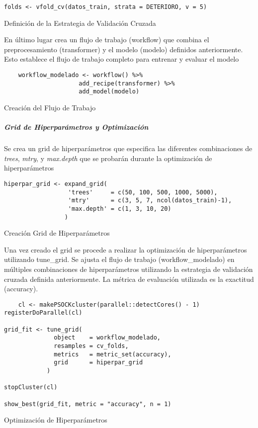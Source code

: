 \begin{code}[H]
\begin{lstlisting}[style=mystyle]
    folds <- vfold_cv(datos_train, strata = DETERIORO, v = 5)
\end{lstlisting}
\caption{Definición de la Estrategia de Validación Cruzada}
\label{code:Definición de la Estrategia de Validación Cruzada}
\end{code}

En último lugar crea un flujo de trabajo (workflow) que combina el preprocesamiento (transformer) y el modelo (modelo) definidos anteriormente. Esto establece el flujo de trabajo completo para entrenar y evaluar el modelo

\begin{code}[H]
\begin{lstlisting}
    workflow_modelado <- workflow() %>%
                     add_recipe(transformer) %>%
                     add_model(modelo)
\end{lstlisting}
\caption{Creación del Flujo de Trabajo}
\label{code:Creación del Flujo de Trabajo}
\end{code}

\subparagraph{Grid de Hiperparámetros y Optimización}

Se crea un grid de hiperparámetros que especifica las diferentes combinaciones de \textit{trees}, \textit{mtry}, y \textit{max.depth} que se probarán durante la optimización de hiperparámetros

\begin{code}[H]
\begin{lstlisting}[style=mystyle]
    hiperpar_grid <- expand_grid(
                  'trees'     = c(50, 100, 500, 1000, 5000),
                  'mtry'      = c(3, 5, 7, ncol(datos_train)-1),
                  'max.depth' = c(1, 3, 10, 20)
                 )
\end{lstlisting}
\caption{Creación Grid de Hiperparámetros}
\label{code:Creación Grid de Hiperparámetros}
\end{code}

Una vez creado el grid se procede a realizar la optimización de hiperparámetros utilizando tune\_grid. Se ajusta el flujo de trabajo (workflow\_modelado) en múltiples combinaciones de hiperparámetros utilizando la estrategia de validación cruzada definida anteriormente. La métrica de evaluación utilizada es la exactitud (accuracy). 

\begin{code}[H]
\begin{lstlisting}
    cl <- makePSOCKcluster(parallel::detectCores() - 1)
registerDoParallel(cl)

grid_fit <- tune_grid(
              object    = workflow_modelado,
              resamples = cv_folds,
              metrics   = metric_set(accuracy),
              grid      = hiperpar_grid
            )

stopCluster(cl)

show_best(grid_fit, metric = "accuracy", n = 1)
\end{lstlisting}
\caption{Optimización de Hiperparámetros}
\label{code:Optimización de Hiperparámetros}
\end{code}


